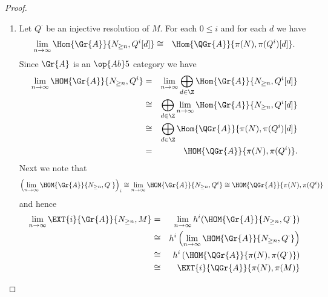 \begin{prop}
  \begin{proof}
    \begin{enumerate}
    \item
      Let $Q^\cdot$ be an injective resolution of $M$.
      For each $0 \leq i$ and for each $d$ we have 
      \begin{eqnarray*}
        \lim_{n \rightarrow \infty}\Hom{\Gr{A}}{N_{\geq n}, Q^i[d]} &\cong& 
        \Hom{\QGr{A}}{\pi(N), \pi(Q^i)[d]}.
      \end{eqnarray*}
      Since $\Gr{A}$ is an $\op{Ab} 5$ category we have
      \begin{eqnarray*}
        \lim_{n \rightarrow \infty}\HOM{\Gr{A}}{N_{\geq n}, Q^i} &=&
        \lim_{n \rightarrow \infty}\bigoplus_{d \in \Z} \Hom{\Gr{A}}{N_{\geq n}, Q^i[d]}\\
        &\cong& \bigoplus_{d \in \Z} \lim_{n \rightarrow \infty}\Hom{\Gr{A}}{N_{\geq n}, Q^i[d]}\\
        &\cong& \bigoplus_{d \in \Z} \Hom{\QGr{A}}{\pi(N), \pi(Q^i)[d]}\\
        &=&\HOM{\QGr{A}}{\pi(N), \pi(Q^i)}.
      \end{eqnarray*}
      Next we note that
      $$\left(\lim_{n \rightarrow \infty} \HOM{\Gr{A}}{N_{\geq n}, Q^\cdot}\right)_i \cong \lim_{n \rightarrow \infty}\HOM{\Gr{A}}{N_{\geq n}, Q^i} \cong \HOM{\QGr{A}}{\pi(N), \pi(Q^i)}$$ and hence
      \begin{eqnarray*}
        \lim_{n \rightarrow \infty} \EXT{i}{\Gr{A}}{N_{\geq n}, M} &=& 
        \lim_{n \rightarrow \infty} h^i(\HOM{\Gr{A}}{N_{\geq n}, Q^\cdot})\\
        &\cong& h^i\left(\lim_{n \rightarrow \infty} \HOM{\Gr{A}}{N_{\geq n}, Q^\cdot}\right)\\
        &\cong& h^i\left(\HOM{\QGr{A}}{\pi(N), \pi(Q^\cdot)}\right)\\
        &\cong& \EXT{i}{\QGr{A}}{\pi(N), \pi(M)}
      \end{eqnarray*}

\end{enumerate}
\end{proof}
\end{prop}
